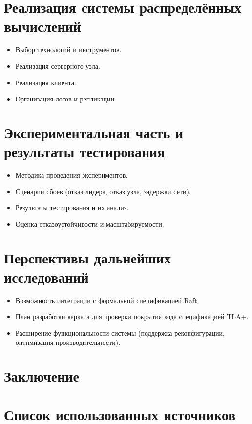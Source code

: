 \section{Реализация системы распределённых вычислений}
\begin{itemize}
    \item Выбор технологий и инструментов.
    \item Реализация серверного узла.
    \item Реализация клиента.
    \item Организация логов и репликации.
\end{itemize}

\section{Экспериментальная часть и результаты тестирования}
\begin{itemize}
    \item Методика проведения экспериментов.
    \item Сценарии сбоев (отказ лидера, отказ узла, задержки сети).
    \item Результаты тестирования и их анализ.
    \item Оценка отказоустойчивости и масштабируемости.
\end{itemize}

\section{Перспективы дальнейших исследований}
\begin{itemize}
    \item Возможность интеграции с формальной спецификацией Raft.
    \item План разработки каркаса для проверки покрытия кода спецификацией TLA+.
    \item Расширение функциональности системы (поддержка реконфигурации, оптимизация производительности).
\end{itemize}

\section*{Заключение}

\section*{Список использованных источников}

